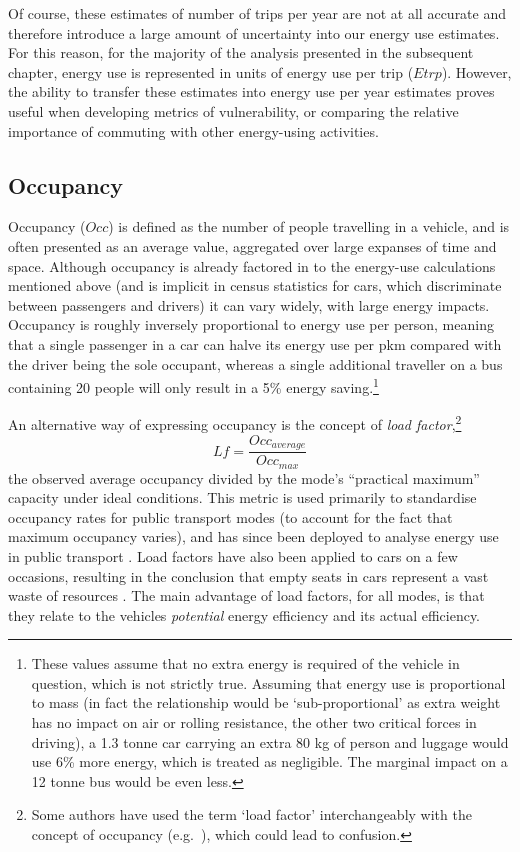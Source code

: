 Of course, these estimates of number of trips per year are not at all
accurate and therefore introduce a large amount of uncertainty into our
energy use estimates. For this reason, for the majority of the analysis
presented in the subsequent chapter, energy use is represented in units of
energy use per trip ($Etrp$). However, the ability to transfer these
estimates into energy use per year estimates proves useful when developing
metrics of vulnerability, or comparing the relative importance of
commuting with other energy-using activities. 

\subsection{Occupancy}
Occupancy ($Occ$) is defined as the number of people travelling in a vehicle, and
is often presented as an average value, aggregated over large expanses of time
and space. Although occupancy is already factored in to the energy-use
calculations mentioned above (and is implicit in census statistics for cars,
which discriminate between passengers and drivers) it can vary widely, with
large energy impacts.
Occupancy is roughly inversely proportional to energy use per person,
meaning that a single passenger in a car can halve its energy use per pkm
compared with the driver being the sole occupant, whereas a single additional
traveller on a bus containing 20 people will only result in a 5\% energy
saving.\footnote{These values
assume that no extra energy is required of the vehicle in question,
which is not strictly true. Assuming that energy use is proportional to
mass (in fact the relationship would be `sub-proportional' as extra weight
has no impact on air or rolling resistance, the other two critical forces
in driving), a 1.3 tonne car carrying an extra 80 kg of person and luggage would
use 6\% more energy, which is treated as negligible. The marginal
impact on a 12 tonne bus would be even less.
}

An alternative way of expressing occupancy is the concept of
\emph{load factor},\footnote{Some
authors have used the term `load factor' interchangeably with the concept
of occupancy (e.g.~\citealp{Jennings2013}), which could lead to confusion.}
\begin{equation}
 Lf = \frac{Occ_{average}}{Occ_{max}}
\end{equation}
the observed average occupancy divided by the mode's ``practical maximum''
\citep[p.~562]{Jackson1975} capacity under ideal conditions.
This metric is used primarily to standardise occupancy rates for public
transport modes (to account for the fact that maximum occupancy varies),
and has since been deployed to analyse energy use in public transport
\citep{Pisarski1975, Schafer1999}. Load factors have also been applied to
cars on a few occasions, resulting in the conclusion that empty seats
in cars represent a vast waste of resources \citep{Jackson1975}.
The main advantage of load factors, for all modes, is that they relate to the
vehicles \emph{potential} energy efficiency and its actual efficiency.


